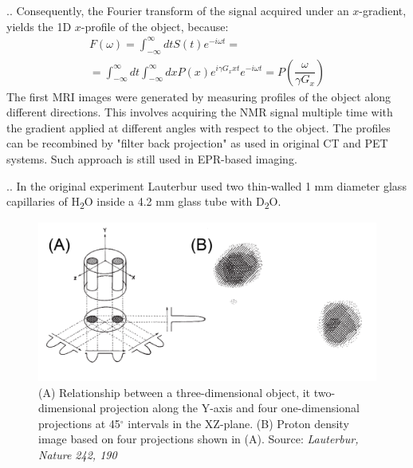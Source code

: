 \documentclass[handout]{beamer}
\begin{document}
\begin{frame}{\thesection.\thesubsection. \insertsubsection}
  Consequently, the Fourier transform of the signal acquired under an $x$-gradient, yields the 1D $x$-profile of the object, because:
  \begin{multline}
    F(\omega) = \int_{ -\infty}^{\infty} dt S(t) e^{-i \omega t} = \\
     = \int_{ -\infty}^{\infty} dt  \int_{ -\infty}^{\infty}  dx P(x) e^{i \gamma G_x x t} e^{-i \omega t} = P(\dfrac{\omega}{\gamma G_x})
  \end{multline}
  The first MRI images were generated by measuring profiles of the object along different directions. This involves acquiring the NMR signal multiple time with the gradient applied at different angles with respect to the object. The profiles can be recombined by "filter back projection" as used in original CT and PET systems. Such approach is still used in EPR-based imaging.
\end{frame}

\begin{frame}{\thesection.\thesubsection. \insertsubsection}
    In the original experiment Lauterbur used two thin-walled 1 mm diameter glass capillaries of H\textsubscript{2}O inside a 4.2 mm glass tube with D\textsubscript{2}O.
   	\begin{figure}
	   	\centering
	   	\includegraphics[scale=0.45]{figures/simple_2D_mri2.png}
	   	\caption{(A) Relationship between a three-dimensional object, it two-dimensional projection along the Y-axis and four one-dimensional projections at 45$^\circ$ intervals in the XZ-plane. (B) Proton density image based on four projections shown in (A). Source: \textit{Lauterbur, Nature 242, 190}}
    \end{figure}
\end{frame}
\end{document}

